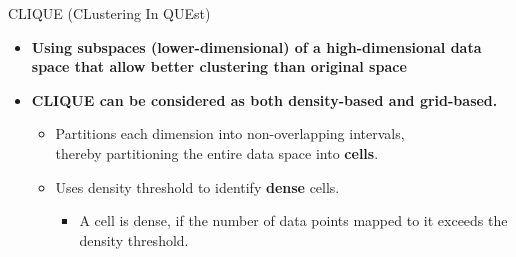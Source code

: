 \begin{frame}{CLIQUE (CLustering In QUEst)}
	\begin{itemize}
		\item \textbf{Using {\color{airforceblue}subspaces} (lower-dimensional)
			      of a high-dimensional data space that allow better clustering than
			      original space}
		\item \textbf{CLIQUE can be considered as both density-based and
			      grid-based.}
		      \begin{itemize}
			      \item Partitions each dimension into non-overlapping intervals, \\
			            thereby partitioning the entire data space into \textbf{cells}.
			      \item Uses density threshold to identify \textbf{dense} cells.
			            \begin{itemize}
				            \item A cell is dense, if the number of data points mapped to
				                  it exceeds the density threshold.
			            \end{itemize}
		      \end{itemize}
	\end{itemize}
\end{frame}

